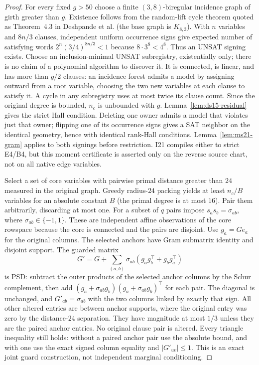 \documentclass[11pt]{article}
\begin{document}
\begin{proof}
For every fixed $g>50$ choose a finite $(3,8)$-biregular incidence graph of girth greater than $g$. Existence follows from the random-lift cycle theorem quoted as Theorem~4.3 in Deshpande et al. (the base graph is $K_{8,3}$). With $n$ variables and $8n/3$ clauses, independent uniform occurrence signs give expected number of satisfying words $2^n(3/4)^{8n/3}<1$ because $8\cdot3^8<4^8$. Thus an UNSAT signing exists. Choose an inclusion-minimal UNSAT subregistry, existentially only; there is no claim of a polynomial algorithm to discover it. It is connected, is linear, and has more than $g/2$ clauses: an incidence forest admits a model by assigning outward from a root variable, choosing the two new variables at each clause to satisfy it. A cycle in any subregistry uses at most twice its clause count. Since the original degree is bounded, $n_c$ is unbounded with $g$. Lemma~\ref{lem:ds15-residual} gives the strict Hall condition. Deleting one owner admits a model that violates just that owner; flipping one of its occurrence signs gives a SAT neighbor on the identical geometry, hence with identical rank-Hall conditions. Lemma~\ref{lem:ms21-gram} applies to both signings before restriction. I21 compiles either to strict E4/B4, but this moment certificate is asserted only on the reverse source chart, not on all native edge variables.

Select a set of core variables with pairwise primal distance greater than $24$ measured in the original graph. Greedy radius-$24$ packing yields at least $n_c/B$ variables for an absolute constant $B$ (the primal degree is at most $16$). Pair them arbitrarily, discarding at most one. For a subset of $q$ pairs impose $s_a s_b=\sigma_{ab}$, where $\sigma_{ab}\in\{-1,1\}$. These are independent affine observations of the core rowspace because the core is connected and the pairs are disjoint. Use $g_a=Ge_a$ for the original columns. The selected anchors have Gram submatrix identity and disjoint support. The guarded matrix
\[
G'=G+\sum_{(a,b)}\sigma_{ab}(g_a g_b^\top+g_b g_a^\top)
\]
is PSD: subtract the outer products of the selected anchor columns by the Schur complement, then add $(g_a+\sigma_{ab}g_b)(g_a+\sigma_{ab}g_b)^\top$ for each pair. The diagonal is unchanged, and $G'_{ab}=\sigma_{ab}$ with the two columns linked by exactly that sign. All other altered entries are between anchor supports, where the original entry was zero by the distance-$24$ separation. They have magnitude at most $1/3$ unless they are the paired anchor entries. No original clause pair is altered. Every triangle inequality still holds: without a paired anchor pair use the absolute bound, and with one use the exact signed column equality and $|G'_{uv}|\le1$. This is an exact joint guard construction, not independent marginal conditioning.


\end{proof}
\end{document}
